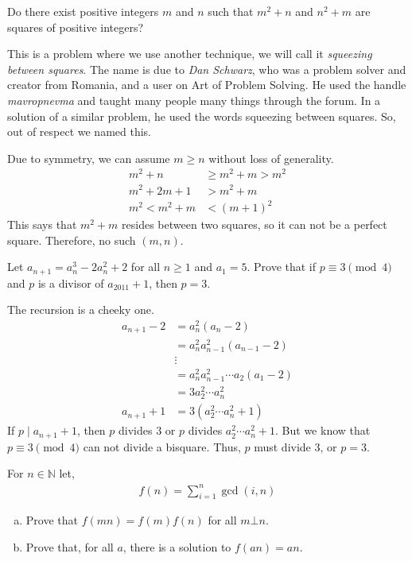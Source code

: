 \begin{problem}[Croatia $2014$]
	Do there exist positive integers $m$ and $n$ such that $m^2+n$ and $n^2+m$ are squares of positive integers?
\end{problem}

This is a problem where we use another technique, we will call it \textit{squeezing between squares}. The name is due to \textit{Dan Schwarz}, who was a problem solver and creator from Romania, and a user on Art of Problem Solving. He used the handle \textit{mavropnevma} and taught many people many things through the forum. In a solution of a similar problem, he used the words squeezing between squares. So, out of respect we named this.
\begin{solution}
	Due to symmetry, we can assume $m\geq n$ without loss of generality.
		\begin{align*}
			m^2+n & \geq m^2+m>m^2\\
			m^2+2m+1 &> m^2+m\\
			m^2 < m^2+m&<(m+1)^2
		\end{align*}
	This says that $m^2+m$ resides between two squares, so it can not be a perfect square. Therefore, no such $(m,n)$.
\end{solution}

\begin{problem}[Turkey $2011$]
	Let $a_{n+1}=a_n^3-2a_n^2+2$ for all $n\geq1$ and $a_1=5$. Prove that if $p\equiv3\pmod4$ and $p$ is a divisor of $a_{2011}+1$, then $p=3$.
\end{problem}

\begin{solution}
	The recursion is a cheeky one.
		\begin{align*}
			a_{n+1}-2 & = a_n^2(a_n-2)\\
			  & = a_n^2a_{n-1}^2(a_{n-1}-2)\\
			  & \vdots\\
			  & = a_n^2a_{n-1}^2\cdots a_2(a_1-2)\\
			  & = 3a_2^2\cdots a_n^2\\
			a_{n+1}+1 & = 3(a_2^2\cdots a_n^2+1)
		\end{align*}
	If $p\mid a_{n+1}+1$, then $p$ divides $3$ or $p$ divides $a_2^2\cdots a_n^2+1$. But we know that $p\equiv3\pmod4$ can not divide a bisquare. Thus, $p$ must divide $3$, or $p=3$.
\end{solution}

\begin{problem}
	For $n\in\mathbb{N} $ let,
		\begin{align*}
			f(n)=\sum\limits_{i=1}^n\gcd(i,n)
		\end{align*}

		\begin{enumerate}[(a)]
			\item Prove that $f(mn)=f(m)f(n)$ for all $m\bot n$.
			\item Prove that, for all $a$, there is a solution to $f(an)=an$.
		\end{enumerate}
\end{problem}

